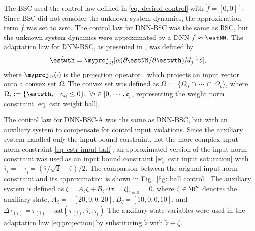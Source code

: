 \documentclass[lettersize,journal]{IEEEtran}
\begin{document}
The BSC used the control law defined in \eqref{eq. desired control} with $\hat f=[0,0]^\top$. Since BSC did not consider the unknown system dynamics, the approximation term $\hat f$ was set to zero.
The control law for DNN-BSC was the same as BSC, but the unknown system dynamics were approximated by a DNN \ie $\hat f\approx \estNN$. The adaptation law for DNN-BSC, as presented in \cite{Patil:2022aa}, was defined by 
\begin{equation}\label{eq:projection}
\dot {\estwth}= \myproj_{\Omega}[\alpha  (\partial \estNN/\partial \estwth)M_0^{-1}{\tilde z}],
\end{equation}
where $\myproj_{\Omega}(\cdot)$ is the projection operator \cite[Appendix E, eq.~(E.4)]{Krstic:1995aa}, which projects an input vector onto a convex set $\Omega$. The convex set was defined as ${\Omega}:= \{\Omega_0\,\cap\,\cdots\,\cap\, \Omega_k\}$, where $\Omega_i:= \{\estwth_i\ \vert \ c_{b_i}\le 0\}, \ \forall i\in[0,\cdots, k]$, representing the weight norm constraint \eqref{eq. cstr weight ball}.

The control law for DNN-BSC-A was the same as DNN-BSC, but with an auxiliary system to compensate for control input violations. Since the auxiliary system handled only the input bound constraint, not the more complex input norm constraint \eqref{eq. cstr input ball}, an approximated version of the input norm constraint was used as an input bound constraint \eqref{eq. cstr input saturation} with ${\overline\tau_i} = -{\underline\tau_i} = (\bar\tau/\sqrt{2}+\bar\tau)/2$. The comparison between the original input norm constraint and its approximation is shown in Fig.~\ref{fig: ball control}.
The auxiliary system is defined as $\dot\zeta = A_\zeta \zeta + B_\zeta \Delta\tau,\quad \zeta\vert_{t=0} = 0$, where $\zeta\in\R^n$ denotes the auxiliary state, $A_\zeta=-[20,0;0;20],B_\zeta=[10,0;0,10]$, and $\Delta\tau_{(i)} = 
\tau_{(i)}-\text{sat}(\tau_{(i)},{\overline\tau_i},{\underline\tau_i})$
The auxiliary state variables were used in the adaptation law \eqref{eq:projection} by substituting ${\tilde z}$ with ${\tilde z}+\zeta$.
\end{document}
